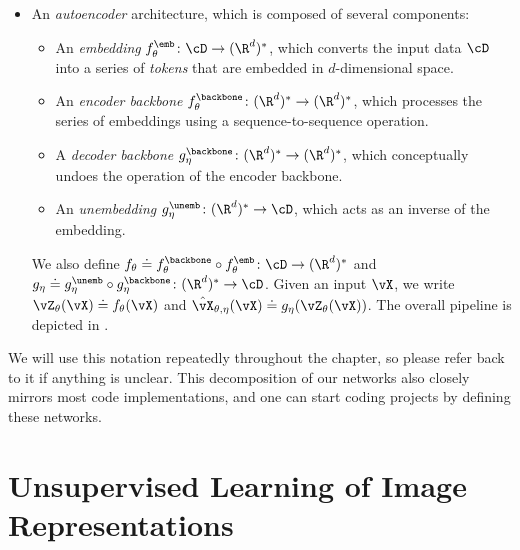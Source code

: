\documentclass[../../book-main.tex]{subfiles}
\begin{document}
\begin{itemize}
    \item An \textit{autoencoder} architecture, which is composed of
        several components:
        \begin{itemize}
            \item An \textit{embedding} \(f_{\theta}^{\emb} \colon
                \cD \to (\R^{d})^{*}\), which converts the input data
                \(\cD\) into a series of \textit{tokens} that are
                embedded in \(d\)-dimensional space.
            \item An \textit{encoder backbone}
                \(f_{\theta}^{\backbone} \colon (\R^{d})^{*} \to
                (\R^{d})^{*}\), which processes the series of
                embeddings using a sequence-to-sequence operation.
            \item A \textit{decoder backbone} \(g_{\eta}^{\backbone}
                \colon (\R^{d})^{*} \to (\R^{d})^{*}\), which
                conceptually undoes the operation of the encoder backbone.
            \item An \textit{unembedding} \(g_{\eta}^{\unemb} \colon
                (\R^{d})^{*} \to \cD\), which acts as an inverse of
                the embedding.
        \end{itemize}
        We also define \(f_{\theta} \doteq f_{\theta}^{\backbone}
        \circ f_{\theta}^{\emb} \colon \cD \to (\R^{d})^{*}\) and
        \(g_{\eta} \doteq g_{\eta}^{\unemb} \circ
        g_{\eta}^{\backbone} \colon (\R^{d})^{*} \to \cD\). Given an
        input \(\vX\), we write \(\vZ_{\theta}(\vX) \doteq
        f_{\theta}(\vX)\) and \(\hat{\vX}_{\theta, \eta}(\vX) \doteq
        g_{\eta}(\vZ_{\theta}(\vX))\). The overall pipeline is
        depicted in .
\end{itemize}

We will use this notation repeatedly throughout the chapter, so please
refer back to it if anything is unclear. This decomposition of our
networks also closely mirrors most code implementations, and one can
start coding projects by defining these networks.

\section{Unsupervised Learning of Image Representations}\label{sec:contrastive_learning}
\end{document}
